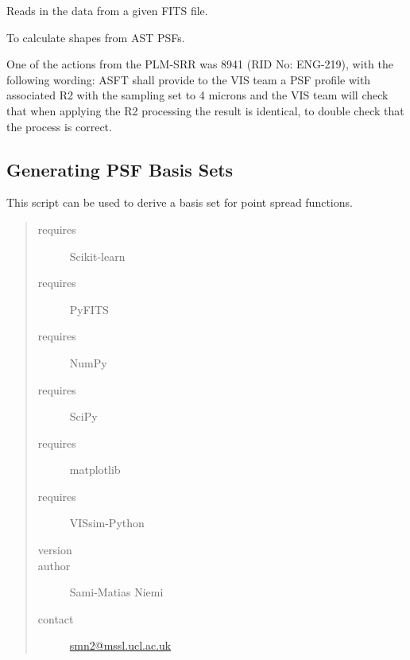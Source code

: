 \documentclass[a4paper,11pt,english]{sphinxmanual}
\begin{document}
\begin{fulllineitems}
\label{analysis:analysis.PSFproperties.readData}
Reads in the data from a given FITS file.

\end{fulllineitems}


\begin{fulllineitems}
\label{analysis:analysis.PSFproperties.shapeComparisonToAST}
To calculate shapes from AST PSFs.

One of the actions from the PLM-SRR was 8941 (RID No: ENG-219), with the
following wording:
ASFT shall provide to the VIS team a PSF profile with associated R2
with the sampling set to 4 microns and the VIS team will check that when
applying the R2 processing the result is identical, to double check that
the process is correct.

\end{fulllineitems}

\label{analysis:module-analysis.PSFbasisSets}

\subsection{Generating PSF Basis Sets}
\label{analysis:generating-psf-basis-sets}
This script can be used to derive a basis set for point spread functions.
\begin{quote}\begin{description}
\item[{requires}] \leavevmode
Scikit-learn

\item[{requires}] \leavevmode
PyFITS

\item[{requires}] \leavevmode
NumPy

\item[{requires}] \leavevmode
SciPy

\item[{requires}] \leavevmode
matplotlib

\item[{requires}] \leavevmode
VISsim-Python

\item[{version}] 

\item[{author}] \leavevmode
Sami-Matias Niemi

\item[{contact}] \leavevmode
\href{mailto:smn2@mssl.ucl.ac.uk}{smn2@mssl.ucl.ac.uk}

\end{description}\end{quote}
\end{document}
